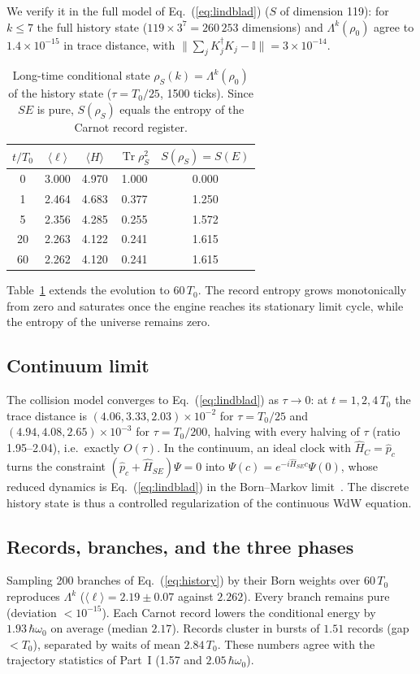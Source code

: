 \documentclass[aps,prc,twocolumn,superscriptaddress,amsmath,amssymb,nofootinbib]{revtex4-2}
\newcommand{\Tr}{\operatorname{Tr}}
\begin{document}
We verify it in the full model of Eq.~(\ref{eq:lindblad}) ($S$ of dimension 119): for $k\le7$ the full history state ($119\times3^7=260\,253$ dimensions) and $\Lambda^k(\rho_0)$ agree to $1.4\times10^{-15}$ in trace distance, with $\|\sum_jK_j^\dagger K_j-\mathbb{I}\|=3\times10^{-14}$.

\begin{table}[t]
\caption{Long-time conditional state $\rho_S(k)=\Lambda^k(\rho_0)$ of the history state ($\tau=T_0/25$, 1500 ticks). Since $SE$ is pure, $S(\rho_S)$ equals the entropy of the Carnot record register.}
\label{tab:longtime}
\begin{ruledtabular}
\begin{tabular}{ccccc}
$t/T_0$ & $\langle\ell\rangle$ & $\langle H\rangle$ & $\Tr\rho_S^2$ & $S(\rho_S)=S(E)$ \\
\hline
0 & 3.000 & 4.970 & 1.000 & 0.000 \\
1 & 2.464 & 4.683 & 0.377 & 1.250 \\
5 & 2.356 & 4.285 & 0.255 & 1.572 \\
20 & 2.263 & 4.122 & 0.241 & 1.615 \\
60 & 2.262 & 4.120 & 0.241 & 1.615 \\
\end{tabular}
\end{ruledtabular}
\end{table}

Table~\ref{tab:longtime} extends the evolution to $60\,T_0$. The record entropy grows monotonically from zero and saturates once the engine reaches its stationary limit cycle, while the entropy of the universe remains zero.

\subsection{Continuum limit}
The collision model converges to Eq.~(\ref{eq:lindblad}) as $\tau\to0$: at $t=1,2,4\,T_0$ the trace distance is $(4.06,3.33,2.03)\times10^{-2}$ for $\tau=T_0/25$ and $(4.94,4.08,2.65)\times10^{-3}$ for $\tau=T_0/200$, halving with every halving of $\tau$ (ratio 1.95--2.04), i.e.\ exactly $O(\tau)$. In the continuum, an ideal clock with $\hat H_C=\hat p_c$ turns the constraint $(\hat p_c+\hat H_{SE})\Psi=0$ into $\Psi(c)=e^{-i\hat H_{SE}c}\Psi(0)$, whose reduced dynamics is Eq.~(\ref{eq:lindblad}) in the Born--Markov limit~\cite{Breuer2002}. The discrete history state is thus a controlled regularization of the continuous WdW equation.

\subsection{Records, branches, and the three phases}
Sampling 200 branches of Eq.~(\ref{eq:history}) by their Born weights over $60\,T_0$ reproduces $\Lambda^k$ ($\langle\ell\rangle=2.19\pm0.07$ against $2.262$). Every branch remains pure (deviation $<10^{-15}$). Each Carnot record lowers the conditional energy by $1.93\,\hbar\omega_0$ on average (median $2.17$). Records cluster in bursts of $1.51$ records (gap $<T_0$), separated by waits of mean $2.84\,T_0$. These numbers agree with the trajectory statistics of Part~I (1.57 and $2.05\,\hbar\omega_0$).
\end{document}
